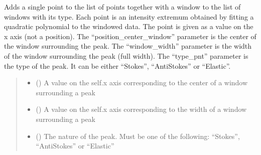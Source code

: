 \documentclass[letterpaper,10pt,english]{sphinxmanual}
\begin{document}
\begin{fulllineitems}
\begin{fulllineitems}
\label{\detokenize{source/_autosummary/HDF5_BLS_analyse.Analyse_VIPA:HDF5_BLS_analyse.Analyse_VIPA.add_point}}
\pysigstartsignatures
\pysiglinewithargsret
{}
{\sphinxparamcomma {}\sphinxparamcomma {}}
{}
\pysigstopsignatures
\sphinxAtStartPar
Adds a single point to the list of points together with a window to the list of windows with its type. Each point is an intensity extremum obtained by fitting a quadratic polynomial to the windowed data.
The point is given as a value on the x axis (not a position).
The “position\_center\_window” parameter is the center of the window surrounding the peak. The “window\_width” parameter is the width of the window surrounding the peak (full width). The “type\_pnt” parameter is the type of the peak. It can be either “Stokes”, “Anti\sphinxhyphen{}Stokes” or “Elastic”.
\begin{quote}\begin{description}
\begin{itemize}
\item {} 
\sphinxAtStartPar
{} () \textendash{} A value on the self.x axis corresponding to the center of a window surrounding a peak

\item {} 
\sphinxAtStartPar
{} () \textendash{} A value on the self.x axis corresponding to the width of a window surrounding a peak

\item {} 
\sphinxAtStartPar
{} () \textendash{} The nature of the peak. Must be one of the following: “Stokes”, “Anti\sphinxhyphen{}Stokes” or “Elastic”

\end{itemize}


\end{description}
\end{quote}
\end{fulllineitems}
\end{fulllineitems}
\end{document}
